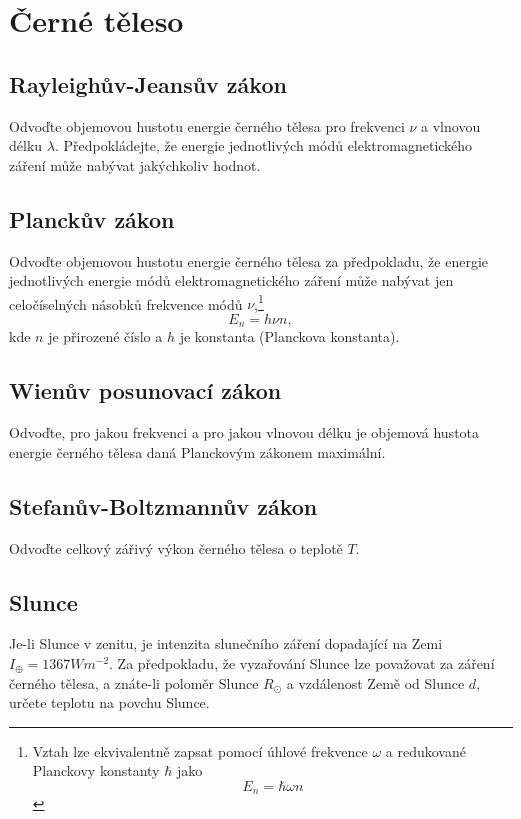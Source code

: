 \section{Černé těleso}
\subsection{Rayleighův-Jeansův zákon}
    Odvoďte objemovou hustotu energie černého tělesa pro frekvenci $\nu$ a vlnovou délku $\lambda$.
    Předpokládejte, že energie jednotlivých módů elektromagnetického záření může nabývat jakýchkoliv hodnot.

\subsection{Planckův zákon}
    Odvoďte objemovou hustotu energie černého tělesa za předpokladu, že energie jednotlivých energie módů elektromagnetického záření může nabývat jen celočíselných násobků frekvence módů $\nu$,\footnote{
        Vztah lze ekvivalentně zapsat pomocí úhlové frekvence $\omega$ a redukované Planckovy konstanty $\hbar$ jako
        \begin{equation}
            E_{n}=\hbar\omega n
        \end{equation}
    }
    \begin{equation*}
        E_{n}=h\nu n,
    \end{equation*}
    kde $n$ je přirozené číslo a $h$ je konstanta (Planckova konstanta).

\subsection{Wienův posunovací zákon}
    Odvoďte, pro jakou frekvenci a pro jakou vlnovou délku je objemová hustota energie černého tělesa daná Planckovým zákonem maximální.

\subsection{Stefanův-Boltzmannův zákon}
    Odvoďte celkový zářivý výkon černého tělesa o teplotě $T$.

\subsection{Slunce}
    Je-li Slunce v zenitu, je intenzita slunečního záření dopadající na Zemi $I_{\oplus}=1367\unit{Wm^{-2}}$.
    Za předpokladu, že vyzařování Slunce lze považovat za záření černého tělesa, a znáte-li poloměr Slunce $R_{\odot}$ a vzdálenost Země od Slunce $d$, určete teplotu na povchu Slunce.

